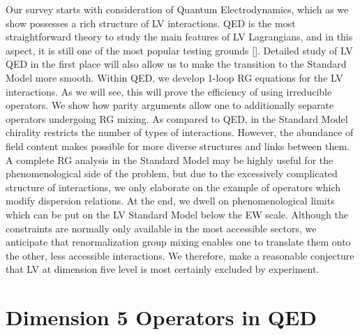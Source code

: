 \documentclass[12pt]{revtex4}
\begin{document}
	Our survey starts with consideration of Quantum Electrodynamics, 
	which as we show possesses a rich structure of LV interactions.
	QED is the most straightforward theory
	to study the main features of LV Lagrangians, and 
	in this aspect,
	it is still one of the most popular testing grounds [].
	Detailed study of LV QED in the first place will also 
	allow us to make the transition to the Standard Model more
	smooth. 
	Within QED, we develop 1-loop RG equations for the LV interactions.
	As we will see, this will prove the efficiency of using irreducible
	operators.
	We show how parity arguments allow one to additionally 
	separate operators undergoing RG mixing.
	As compared to QED, in the Standard Model chirality restricts the number of types
	of interactions. 
	However, the abundance of field content makes possible for more diverse 
	structures and links between them.
	A complete RG analysis in the Standard Model may be highly useful for 
	the phenomenological side of the problem, but due to the excessively 
	complicated structure of interactions, we only elaborate on the example of 
	operators which modify dispersion relations.
	At the end, we dwell on phenomenological limits which can be put
	on the LV Standard Model below the EW scale.
	Although the constraints are normally only available in the most
	accessible sectors, we anticipate that renormalization group mixing
	enables one to translate them onto the other, less accessible interactions.
	We therefore, make a reasonable conjecture that LV at dimension five level is
	most certainly excluded by experiment.
	
	

\section{Dimension 5 Operators in QED}
\end{document}
